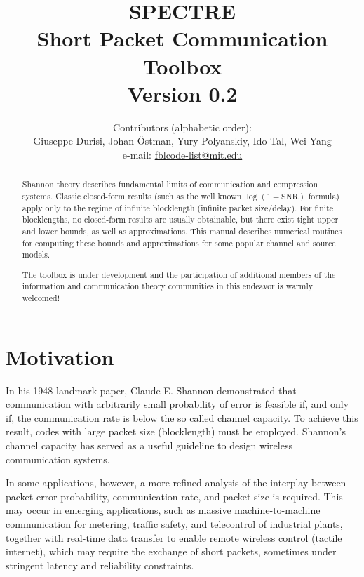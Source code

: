 \documentclass[a4paper,11p]{memoir}
\begin{document}
\title{SPECTRE\\
Short Packet Communication Toolbox\\[1cm]
Version 0.2}

\author{Contributors (alphabetic order):\\
Giuseppe Durisi, Johan \"Ostman, Yury Polyanskiy, Ido Tal, Wei Yang\\[10pt]
e-mail: \url{fblcode-list@mit.edu}}




\maketitle

\begin{abstract}

Shannon theory describes fundamental limits of communication and
compression systems. Classic closed-form results
(such as the well known $\log(1+\mathrm{SNR})$ formula)   apply only to the regime of infinite blocklength
(infinite packet size/delay). For finite blocklengths, no closed-form results are usually
obtainable, but there  exist tight upper and lower bounds, as well as
approximations. This manual describes numerical routines for  computing
these bounds and approximations for some popular channel and
source models.

The toolbox is under development and the participation of additional
members of the information and communication theory communities in
this endeavor is warmly welcomed!
\end{abstract}
\newpage
\tableofcontents

\newpage
\chapter{Motivation}
%
  In his 1948 landmark paper, Claude E. Shannon demonstrated that communication with arbitrarily small probability of error is feasible if, and only if, the communication rate is below the so called channel capacity. 
  To achieve this result, codes with large packet size (blocklength) must be employed. 
 Shannon's channel capacity has served as a useful guideline to design wireless communication systems.

In some applications, however, a more refined analysis of the interplay between packet-error probability, communication rate, and packet size is required.
  This may occur in emerging applications, such as massive machine-to-machine communication for metering, traffic safety, and telecontrol of industrial plants, together with real-time data transfer to enable remote wireless control (tactile internet), which may require the exchange of short packets, sometimes under stringent latency and reliability constraints.
  
\end{document}
